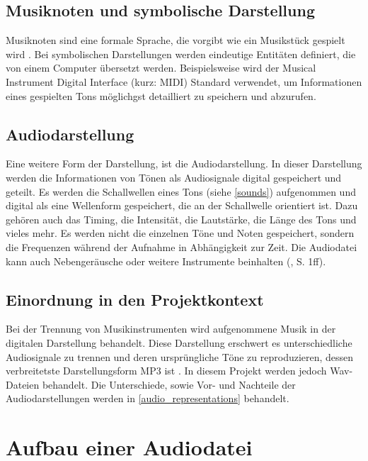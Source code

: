%
\subsection{Musiknoten und symbolische Darstellung}
%

Musiknoten sind eine formale Sprache, die vorgibt wie ein Musikstück gespielt wird \parencite{sheet_music_representations}. Bei symbolischen Darstellungen werden eindeutige Entitäten definiert, die von einem Computer übersetzt werden. Beispielsweise wird der Musical Instrument Digital Interface (kurz: MIDI) Standard verwendet, um Informationen eines gespielten Tons möglichgst detailliert zu speichern und abzurufen.

\subsection{Audiodarstellung}

Eine weitere Form der Darstellung, ist die Audiodarstellung. In dieser Darstellung werden die Informationen von Tönen als Audiosignale digital gespeichert und geteilt. Es werden die Schallwellen eines Tons (siehe \cref{sounds}) aufgenommen und digital als eine Wellenform gespeichert, die an der Schallwelle orientiert ist. Dazu gehören auch das Timing, die Intensität, die Lautstärke, die Länge des Tons und vieles mehr. Es werden nicht die einzelnen Töne und Noten gespeichert, sondern die Frequenzen während der Aufnahme in Abhängigkeit zur Zeit. Die Audiodatei kann auch Nebengeräusche oder weitere Instrumente beinhalten (\cite{fundamentals_of_music_processing}, S. 1ff).

%
\subsection{Einordnung in den Projektkontext}
%

Bei der Trennung von Musikinstrumenten wird aufgenommene Musik in der digitalen Darstellung behandelt. Diese Darstellung erschwert es unterschiedliche Audiosignale zu trennen und deren ursprüngliche Töne zu reproduzieren, dessen verbreitetste Darstellungsform MP3 ist \parencite{mp3_most_popular}. In diesem Projekt werden jedoch Wav-Dateien behandelt. Die Unterschiede, sowie Vor- und Nachteile der Audiodarstellungen werden in \cref{audio_representations} behandelt.

%
\section{Aufbau einer Audiodatei}
%

